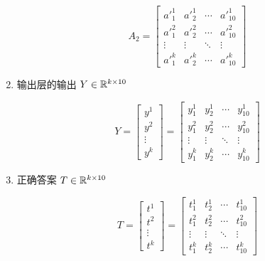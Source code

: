 \documentclass[12pt,a4paper]{amsart}
\begin{document}
\begin{enumerate}
		\begin{equation}
			A_2 = \begin{bmatrix}
				{a'}_1^1 & {a'}_2^1 & \cdots & {a'}_{10}^1 \\
				{a'}_1^2 & {a'}_2^2 & \cdots & {a'}_{10}^2 \\
				\vdots   & \vdots   & \ddots & \vdots      \\
				{a'}_1^k & {a'}_2^k & \cdots & {a'}_{10}^k
			\end{bmatrix}
		\end{equation}

	\item 输出层的输出 $Y \in \mathbb{R}^{k \times 10}$

		\begin{equation}
			Y = \begin{bmatrix}
				y^1    \\
				y^2    \\
				\vdots \\
				y^k
			\end{bmatrix} = \begin{bmatrix}
				y_1^1  & y_2^1  & \cdots & y_{10}^1 \\
				y_1^2  & y_2^2  & \cdots & y_{10}^2 \\
				\vdots & \vdots & \ddots & \vdots    \\
				y_1^k  & y_2^k  & \cdots & y_{10}^k
			\end{bmatrix}
		\end{equation}

	\item 正确答案 $T \in \mathbb{R}^{k\times 10}$

		\begin{equation}
			T = \begin{bmatrix}
				t^1    \\
				t^2    \\
				\vdots \\
				t^k
			\end{bmatrix} = \begin{bmatrix}
				t_1^1  & t_2^1  & \cdots & t_{10}^1 \\
				t_1^2  & t_2^2  & \cdots & t_{10}^2 \\
				\vdots & \vdots & \ddots & \vdots    \\
				t_1^k  & t_2^k  & \cdots & t_{10}^k
			\end{bmatrix}
		\end{equation}

\end{enumerate}
\end{document}
